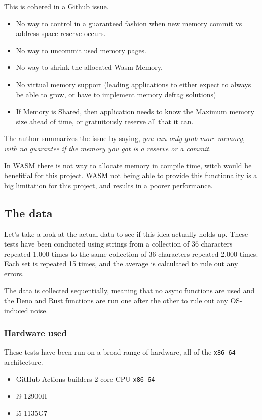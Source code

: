 \documentclass[10pt,journal,compsoc]{IEEEtran}
\begin{document}
This is cobered in a Github issue. \cite{WASMBAD}

\begin{itemize}
    \item No way to control in a guaranteed fashion when new memory commit vs address space reserve occurs.
    \item No way to uncommit used memory pages.
    \item No way to shrink the allocated Wasm Memory.
    \item No virtual memory support (leading applications to either expect to always be able to grow, or have to implement memory defrag solutions)
    \item If Memory is Shared, then application needs to know the Maximum memory size ahead of time, or gratuitously reserve all that it can.
\end{itemize}

The author summarizes the issue by saying, \textit{you can only grab more memory, with no guarantee if the memory you got is a reserve or a commit}.

In WASM there is not way to allocate memory in compile time, witch would be benefitial for this project. WASM not being able to provide this functionality is a big limitation for this project, and results in a poorer performance.

\subsection{The data}

Let's take a look at the actual data to see if this idea actually holds up. These tests have been conducted using strings from a collection of 36 characters repeated 1,000 times to the same collection of 36 characters repeated 2,000 times. Each set is repeated 15 times, and the average is calculated to rule out any errors.

The data is collected sequentially, meaning that no async functions are used and the Deno and Rust functions are run one after the other to rule out any OS-induced noise.

\subsubsection{Hardware used}

These tests have been run on a broad range of hardware, all of the \verb|x86_64| architecture.

\begin{itemize}
    \item GitHub Actions builders 2-core CPU \verb|x86_64| \cite{Github}
    \item i9-12900H
    \item i5-1135G7
\end{itemize}
\end{document}
